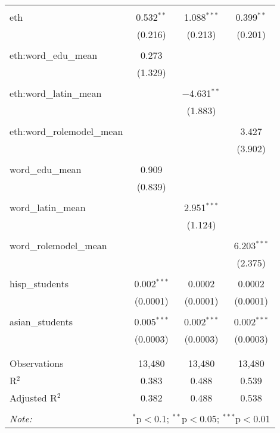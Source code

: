 \begin{table}[!htbp]
\begin{tabular}{@{\extracolsep{-2pt}}lccc}
  & & & \\ 
 eth & 0.532$^{**}$ & 1.088$^{***}$ & 0.399$^{**}$ \\ 
  & (0.216) & (0.213) & (0.201) \\ 
  & & & \\ 
 eth:word\_edu\_mean & 0.273 &  &  \\ 
  & (1.329) &  &  \\ 
  & & & \\ 
 eth:word\_latin\_mean &  & $-$4.631$^{**}$ &  \\ 
  &  & (1.883) &  \\ 
  & & & \\ 
 eth:word\_rolemodel\_mean &  &  & 3.427 \\ 
  &  &  & (3.902) \\ 
  & & & \\ 
 word\_edu\_mean & 0.909 &  &  \\ 
  & (0.839) &  &  \\ 
  & & & \\ 
 word\_latin\_mean &  & 2.951$^{***}$ &  \\ 
  &  & (1.124) &  \\ 
  & & & \\ 
 word\_rolemodel\_mean &  &  & 6.203$^{***}$ \\ 
  &  &  & (2.375) \\ 
  & & & \\ 
 hisp\_students & 0.002$^{***}$ & 0.0002 & 0.0002 \\ 
  & (0.0001) & (0.0001) & (0.0001) \\ 
  & & & \\ 
 asian\_students & 0.005$^{***}$ & 0.002$^{***}$ & 0.002$^{***}$ \\ 
  & (0.0003) & (0.0003) & (0.0003) \\ 
  & & & \\ 
\hline \\[-1.8ex] 
Observations & 13,480 & 13,480 & 13,480 \\ 
R$^{2}$ & 0.383 & 0.488 & 0.539 \\ 
Adjusted R$^{2}$ & 0.382 & 0.488 & 0.538 \\ 
\hline 
\hline \\[-1.8ex] 
\textit{Note:}  & \multicolumn{3}{r}{$^{*}$p$<$0.1; $^{**}$p$<$0.05; $^{***}$p$<$0.01} \\ 
\end{tabular} 
\end{table} 
